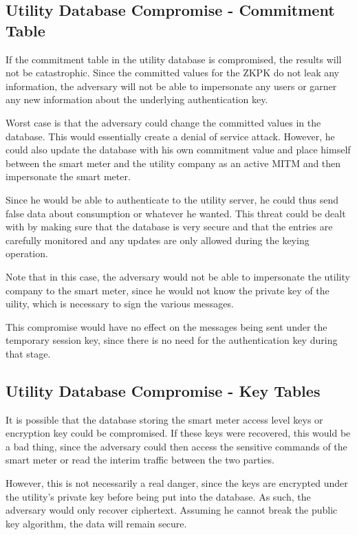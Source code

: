 \subsection{Utility Database Compromise - Commitment Table}
If the commitment table in the utility database is compromised, the results will not be catastrophic. Since the committed
values for the ZKPK do not leak any information, the adversary will not be able to impersonate any users or garner
any new information about the underlying authentication key.

Worst case is that the adversary could change the committed values in the database. This would essentially create a
denial of service attack. However, he could also update the database with his own commitment value and place
himself between the smart meter and the utility company as an active MITM and then impersonate the smart
meter. 

Since he would be able to authenticate to the utility server, he could thus send false data about consumption or 
whatever he wanted. This threat could be dealt with by making sure that the database is very secure
and that the entries are  carefully monitored and any updates are only allowed during the keying operation.

Note that in this case, the adversary would not be able to impersonate the utility company to the smart meter,
since he would not know the private key of the uility, which is necessary to sign the various messages.

This compromise would have no effect on the messages being sent under the temporary session key, since
there is no need for the authentication key during that stage.

\subsection{Utility Database Compromise - Key Tables }
It is possible that the database storing the smart meter access level keys or encryption key could be compromised. 
If these keys were recovered, this would be a bad thing, since the adversary could then access the sensitive commands
of the smart meter or read the interim traffic between the two parties.

However, this is not necessarily a real danger, since the keys are encrypted under the utility's private key before being
put into the database. As such, the adversary would only recover ciphertext. Assuming he cannot break the public
key algorithm, the data will remain secure.

